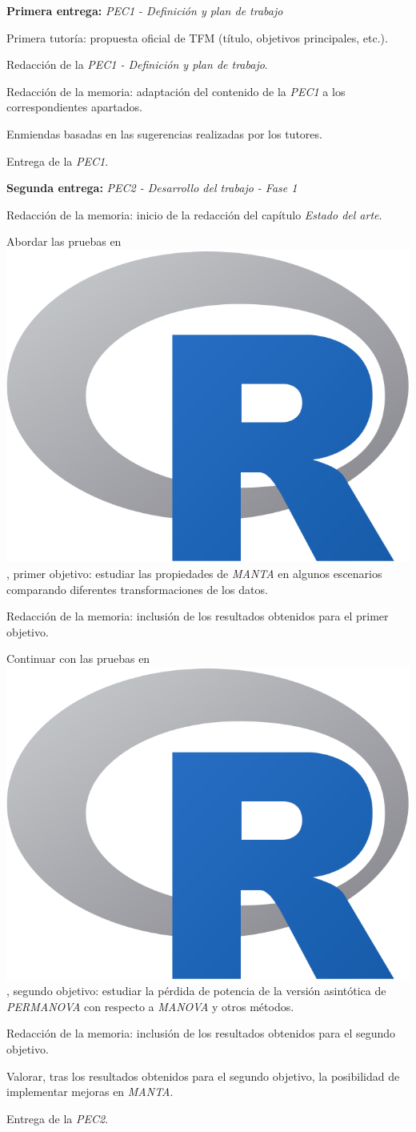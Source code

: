 \documentclass[IB,BIB]{TFUOC}%
\newcommand{\checkbox}{\text{\fboxsep=-.15pt\fbox{\rule{0pt}{1.5ex}\rule{1.5ex}{0pt}}}} %
\newcommand{\cmark}{\ding{51}} %
\newcommand{\xmark}{\ding{55}} %
\newcommand{\progress}{\ding{46}} %
\newcommand{\done}{\rlap{\checkbox}{\raisebox{1.2pt}{\large\hspace{1pt}\cmark}}
\hspace{-2.5pt}}
\newcommand{\wontfix}{\rlap{\checkbox}{\raisebox{-1.5pt}{\large\hspace{-.75pt}\xmark}}
\hspace{-2.5pt}}
\newcommand{\Rlogo}{\protect\includegraphics[height=2.5ex,keepaspectratio]{Rlogo.png}}
\begin{document}
\begin{todolist}
  \item[\done] \textbf{Primera entrega:} \textit{PEC1 - Definición y plan de trabajo}
  \begin{todolist}
  \item[\done] Primera tutoría: propuesta oficial de TFM (título, objetivos principales, etc.).
  \item[\done] Redacción de la \textit{PEC1 - Definición y plan de trabajo}.
  \item[\done] Redacción de la memoria: adaptación del contenido de la \textit{PEC1} a los correspondientes apartados.
  \item[\done] Enmiendas basadas en las sugerencias realizadas por los tutores.
  \item[\done] Entrega de la \textit{PEC1}.
  \end{todolist}
\end{todolist}

\begin{todolist}
  \item[\done] \textbf{Segunda entrega:} \textit{PEC2 - Desarrollo del trabajo - Fase 1}
  \begin{todolist}
  \item[\progress] Redacción de la memoria: inicio de la redacción del capítulo \textit{Estado del arte}.
  \item[\done] Abordar las pruebas en \hspace{-.2em}\Rlogo\hspace{+.1em}, primer objetivo: estudiar las propiedades de \textit{MANTA} en algunos escenarios comparando diferentes transformaciones de los datos.
  \item[\progress] Redacción de la memoria: inclusión de los resultados obtenidos para el primer objetivo.
  \item[\done] Continuar con las pruebas en \hspace{-.2em}\Rlogo\hspace{+.1em}, segundo objetivo: estudiar la pérdida de potencia de la versión asintótica de \textit{PERMANOVA} con respecto a \textit{MANOVA} y otros métodos.
  \item[\progress] Redacción de la memoria: inclusión de los resultados obtenidos para el segundo objetivo.
  \item[\wontfix] Valorar, tras los resultados obtenidos para el segundo objetivo, la posibilidad de implementar mejoras en \textit{MANTA}.
  \item[\done] Entrega de la \textit{PEC2}.
  \end{todolist}
\end{todolist}
\end{document}
